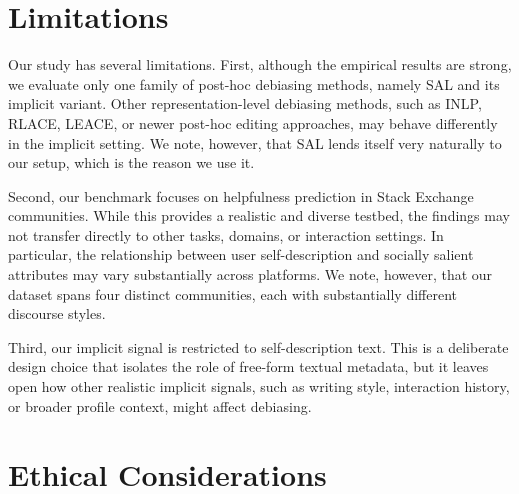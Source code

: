 \documentclass[11pt]{article}
\begin{document}
\section*{Limitations}


Our study has several limitations. First, although the empirical results are strong, we evaluate only one family of post-hoc debiasing methods, namely SAL and its implicit variant. Other representation-level debiasing methods, such as INLP, RLACE, LEACE, or newer post-hoc editing approaches, may behave differently in the implicit setting. We note, however, that SAL lends itself very naturally to our setup, which is the reason we use it.

Second, our benchmark focuses on helpfulness prediction in Stack Exchange communities. While this provides a realistic and diverse testbed, the findings may not transfer directly to other tasks, domains, or interaction settings. In particular, the relationship between user self-description and socially salient attributes may vary substantially across platforms. We note, however, that our dataset spans four distinct communities, each with substantially different discourse styles.

Third, our implicit signal is restricted to self-description text. This is a deliberate design choice that isolates the role of free-form textual metadata, but it leaves open how other realistic implicit signals, such as writing style, interaction history, or broader profile context, might affect debiasing.








\section*{Ethical Considerations}
\end{document}
